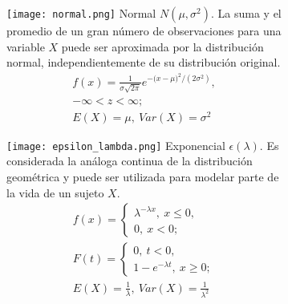 \begin{figure}[H]
\begin{subfigure}[t]{.475\textwidth}\texttt{[image: normal.png]}
Normal $N(\mu,\sigma^2)$. La suma y el promedio de un gran número de observaciones para una variable $X$ puede ser aproximada por la distribución normal, independientemente de su distribución original.
\begin{equation}\begin{matrix}
f(x)=\frac{1}{\sigma\sqrt{2\pi}}e^{-({x-\mu)}^2/(2\sigma^2)},\\
-\infty<z<\infty;\\
E(X)=\mu,\ Var(X)=\sigma^2
\end{matrix}\end{equation}\end{subfigure}\qquad
\begin{subfigure}[t]{.475\textwidth}\texttt{[image: epsilon\_lambda.png]}
Exponencial $\epsilon(\lambda)$. Es considerada la análoga continua de la distribución geométrica y puede ser utilizada para modelar parte de la vida de un sujeto $X$.
\begin{equation}\begin{matrix}
f(x)=\begin{cases}\lambda^{-\lambda x},\ x\leq0,\\0,\ x<0;\end{cases}\\
F(t)=\begin{cases}0,\ t<0,\\1-e^{-\lambda t},\ x\geq 0;\end{cases}\\
E(X)=\frac{1}{\lambda},\ Var(X)=\frac{1}{\lambda^2}
\end{matrix}\end{equation}\end{subfigure}
\end{figure}

